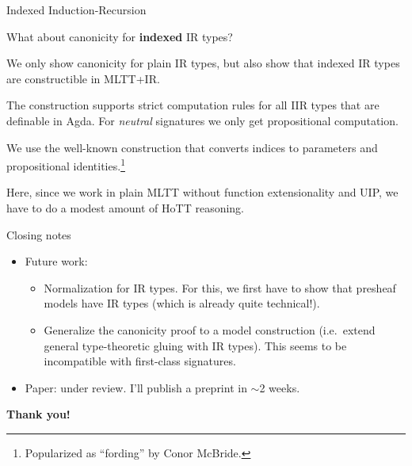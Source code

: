 \documentclass[dvipsnames,aspectratio=169]{beamer}
\begin{document}
\begin{frame}{Indexed Induction-Recursion}

What about canonicity for \textbf{indexed} IR types?
\vspace{1em}

We only show canonicity for plain IR types, but also show that indexed IR types are
constructible in MLTT+IR.
\vspace{1em}

The construction supports strict computation rules for all IIR types that
are definable in Agda. For \emph{neutral} signatures we only get propositional computation.

\vspace{1em}
We use the well-known construction that converts indices to parameters and propositional identities.\footnote{Popularized as ``fording'' by Conor McBride.}

\vspace{1em}
Here, since we work in plain MLTT without function extensionality and UIP, we have to do a modest amount of HoTT reasoning.

\end{frame}

\begin{frame}{Closing notes}

\vspace{-1em}
\begin{itemize}
\item Future work:
  \begin{itemize}
    \item Normalization for IR types. For this, we first have to show that presheaf models have IR types (which is already quite technical!).
    \item Generalize the canonicity proof to a model construction (i.e.\ extend general type-theoretic gluing with IR types). This seems to
          be incompatible with first-class signatures.
  \end{itemize}
\item Paper: under review. I'll publish a preprint in $\sim$2 weeks.
\end{itemize}
\vspace{2em}
\pause

\begin{center}
  {\Large{\textbf{Thank you!}}}
\end{center}
\end{frame}



\end{document}

